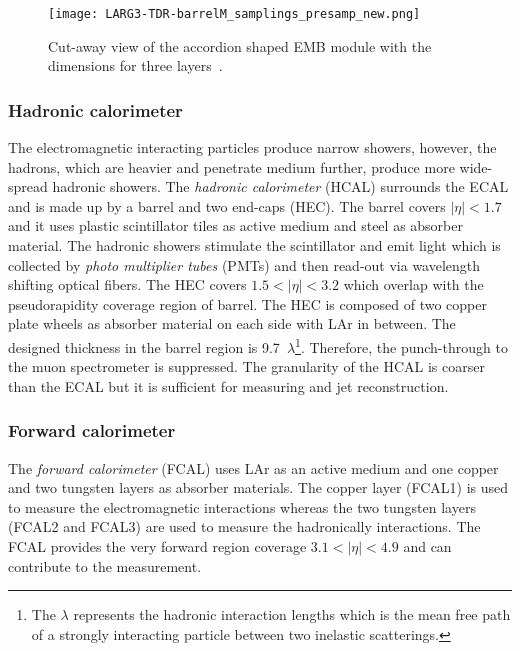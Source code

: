 \begin{figure}[htbp]
    \begin{center}
        \texttt{[image: LARG3-TDR-barrelM\_samplings\_presamp\_new.png]}
        \caption{Cut-away view of the accordion shaped EMB module with the dimensions for three layers~\cite{Strizenec:2014ida}.}
        \label{fig:ae_ecal}
    \end{center}
\end{figure}


\subsubsection{Hadronic calorimeter}
\label{subsubsec:ae_hcal}
The electromagnetic interacting particles produce narrow showers, however, the hadrons, which are heavier and penetrate medium further, produce more wide-spread hadronic showers.
The \textit{hadronic calorimeter} (HCAL) surrounds the ECAL and is made up by a barrel and two end-caps  (HEC).
The barrel covers $|\eta| < 1.7$ and it uses plastic scintillator tiles as active medium and steel as absorber material.
The hadronic showers stimulate the scintillator and emit light which is collected by \textit{photo multiplier tubes} (PMTs) and then read-out via wavelength shifting optical fibers. 
The HEC covers $1.5 < |\eta| < 3.2$ which overlap with the pseudorapidity coverage region of barrel.
The HEC is composed of two copper plate wheels as absorber material on each side with LAr in between.
The designed thickness in the barrel region is 9.7~$\lambda$\footnote{The $\lambda$ represents the hadronic interaction lengths which is the mean free path of a strongly interacting particle between two inelastic scatterings.}.
Therefore, the punch-through to the muon spectrometer is suppressed.
The granularity of the HCAL is coarser than the ECAL but it is sufficient for measuring \met and jet reconstruction.


\subsubsection{Forward calorimeter}
\label{subsubsec:ae_fcal}
The \textit{forward calorimeter} (FCAL) uses LAr as an active medium and one copper and two tungsten layers as absorber materials.
The copper layer (FCAL1) is used to measure the electromagnetic interactions whereas the two tungsten layers (FCAL2 and FCAL3) are used to measure the hadronically interactions.
The FCAL provides the very forward region coverage $3.1 < |\eta| < 4.9$ and can contribute to the \met measurement.

